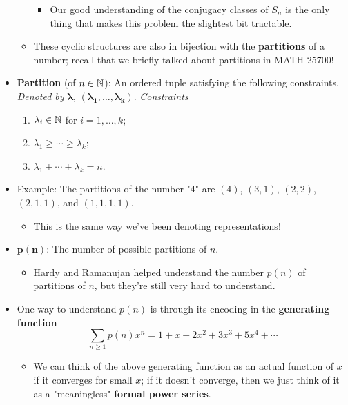 \documentclass[../notes.tex]{subfiles}
\begin{document}
\begin{itemize}
\begin{itemize}
        \begin{itemize}
            \item Our good understanding of the conjugacy classes of $S_n$ is the only thing that makes this problem the slightest bit tractable.
        \end{itemize}
        \item These cyclic structures are also in bijection with the \textbf{partitions} of a number; recall that we briefly talked about partitions in MATH 25700!
    \end{itemize}
    \item \textbf{Partition} (of $n\in\mathbb{N}$): An ordered tuple satisfying the following constraints. \emph{Denoted by} $\bm{\lambda}$, $\bm{(\lambda_1,\ldots,\lambda_k)}$. \emph{Constraints}
    \begin{enumerate}
        \item $\lambda_i\in\mathbb{N}$ for $i=1,\dots,k$;
        \item $\lambda_1\geq\cdots\geq\lambda_k$;
        \item $\lambda_1+\cdots+\lambda_k=n$.
    \end{enumerate}
    \item Example: The partitions of the number "4" are $(4)$, $(3,1)$, $(2,2)$, $(2,1,1)$, and $(1,1,1,1)$.
    \begin{itemize}
        \item This is the same way we've been denoting representations!
    \end{itemize}
    \item $\bm{p(n)}$: The number of possible partitions of $n$.
    \begin{itemize}
        \item Hardy and Ramanujan helped understand the number $p(n)$ of partitions of $n$, but they're still very hard to understand.
    \end{itemize}
    \item One way to understand $p(n)$ is through its encoding in the \textbf{generating function}
    \begin{equation*}
        \sum_{n\geq 1}p(n)x^n = 1+x+2x^2+3x^3+5x^4+\cdots
    \end{equation*}
    \begin{itemize}
        \item We can think of the above generating function as an actual function of $x$ if it converges for small $x$; if it doesn't converge, then we just think of it as a "meaningless" \textbf{formal power series}.

\end{itemize}
\end{itemize}
\end{document}
